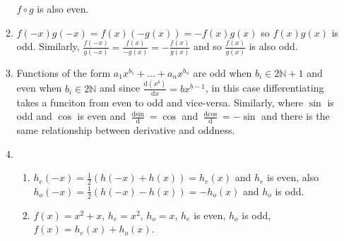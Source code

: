 \documentclass[10pt]{article}
\newcommand*{\df}[2]{\frac{\text{d}{#1}}{\text{d}{#2}}}%
\begin{document}
\begin{enumerate}
\begin{enumerate}
                    $f \circ g$ is also even.
                \item $f(-x)g(-x) = f(x)(-g(x)) = -f(x)g(x)$ so $f(x)g(x)$ is
                    odd. Similarly, $\frac{f(-x)}{g(-x)} = \frac{f(x)}{-g(x)} =
                    -\frac{f(x)}{g(x)}$ and so $\frac{f(x)}{g(x)}$ is also odd.
                \item Functions of the form $a_1x^{b_1} + ... + a_nx^{b_n}$ are
                    odd when $b_i \in 2\mathbb{N} + 1$ and even when $b_i \in
                    2\mathbb{N}$ and since $\df{(x^b)}{x} = bx^{b -1}$, in this
                    case differentiating takes a funciton from even to odd and
                    vice-versa. Similarly, where $\sin$ is odd and $\cos$ is
                    even and $\df{\sin}{} = \cos$ and $\df{\cos}{} = -\sin$ and
                    there is the same relationship between derivative and
                    oddness.
                \item
                    \begin{enumerate}
                        \item $h_e(-x) = \frac{1}{2}(h(-x) + h(x)) = h_e(x)$ and $h_e$ is even, also
                        $h_o(-x) = \frac{1}{2}(h(-x) - h(x)) = -h_o(x)$  and $h_o$ is odd.
                    \item $f(x) = x^2 + x$, $h_e = x^2$, $h_o = x$, $h_e$ is
                        even, $h_o$ is odd, $f(x) = h_e(x) + h_o(x)$.
                    \end{enumerate}
            \end{enumerate}
    \end{enumerate}
\end{document}
